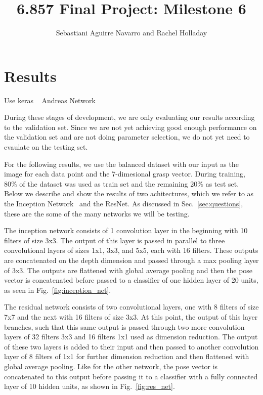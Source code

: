\documentclass[letterpaper, 10 pt, conference]{../ieeeconf}
\newcommand{\sref}[1]{Sec.~\ref{#1}} %
\newcommand{\figref}[1]{Fig.~\ref{#1}} %
\begin{document}
\title{6.857 Final Project: Milestone 6}
\author{Sebastiani Aguirre Navarro and Rachel Holladay}
\maketitle





\section{Results}
\label{sec:results}
Use keras ~\cite{chollet2017keras}
Andreas Network ~\cite{viereck2017learning}


During these stages of development, we are only evaluating our results according to the validation set. 
Since we are not yet achieving good enough performance on the validation set and are not doing parameter selection, we do not yet need to evaulate on the testing set. 

For the following results, we use the balanced dataset with our input as the image for each data point and the 7-dimesional grasp vector. 
During training, 80\% of the dataset was used as train set and the remaining 20\% as test set. 
Below we describe and show the results of two achitectures, which we refer to as the Inception Network~\cite{szegedy2015going} and the ResNet.
As discussed in \sref{sec:questions}, these are the some of the many networks we will be testing.  

The inception network consists of 1 convolution layer in the beginning with 10 filters of size 3x3. 
The output of this layer is passed in parallel to three convolutional layers of sizes 1x1, 3x3, and 5x5, each with 16 filters. 
These outputs are concatenated on the depth dimension and passed through a max pooling layer of 3x3. 
The outputs are flattened with global average pooling and then the pose vector is concatenated before passed to a classifier of one hidden layer of 20 units, as seen in \figref{fig:inception_net}. 

The residual network consists of two convolutional layers, one with 8 filters of size 7x7 and the next with 16 filters of size 3x3.
At this point, the output of this layer branches, such that this same output is passed through two more convolution layers of 32 filters 3x3 and 16 filters 1x1 used as dimension reduction. 
The output of these two layers is added to their input and then passed to another convolution layer of 8 filters of 1x1 for further dimension reduction and then flattened with global average pooling. 
Like for the other network, the pose vector is concatenated to this output before passing it to a classifier with a fully connected layer of 10 hidden units, as shown in \figref{fig:res_net}.
 
\end{document}
